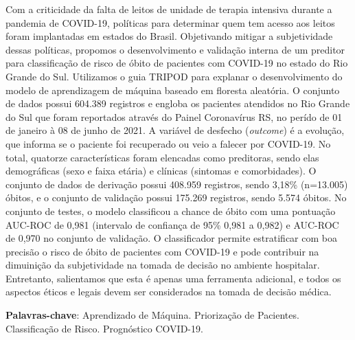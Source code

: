 \begin{resumo}

Com a criticidade da falta de leitos de unidade de terapia intensiva durante a pandemia de COVID-19, políticas para determinar quem tem acesso aos leitos foram implantadas em estados do Brasil. Objetivando mitigar a subjetividade dessas políticas, propomos o desenvolvimento e validação interna de um preditor para classificação de risco de óbito de pacientes com COVID-19 no estado do Rio Grande do Sul.
Utilizamos o guia TRIPOD para explanar o desenvolvimento do modelo de aprendizagem de máquina baseado em floresta aleatória.
O conjunto de dados possui 604.389 registros e engloba os pacientes atendidos no Rio Grande do Sul que foram reportados através do Painel Coronavírus RS, no perído de 01 de janeiro à 08 de junho de 2021.
A variável de desfecho (\textit{outcome}) é a evolução, que informa se o paciente foi recuperado ou veio a falecer por COVID-19. No total, quatorze características foram elencadas como preditoras, sendo elas demográficas (sexo e faixa etária) e clínicas (sintomas e comorbidades). 
O conjunto de dados de derivação possui 408.959 registros, sendo 3,18\% (n=13.005) óbitos, e o conjunto de validação possui 175.269 registros, sendo 5.574 óbitos. No conjunto de testes, o modelo classificou a chance de óbito com uma pontuação AUC-ROC de 0,981 (intervalo de confiança  de 95\% 0,981 a 0,982) e AUC-ROC de 0,970 no conjunto de validação.
O classificador permite estratificar com boa precisão o risco de óbito de pacientes com COVID-19 e pode contribuir na dimuinição da subjetividade na tomada de decisão no ambiente hospitalar. Entretanto, salientamos que esta é apenas uma ferramenta adicional, e todos os aspectos éticos e legais devem ser considerados na tomada de decisão médica.
\vspace{\onelineskip}

    
 \noindent
 \textbf{Palavras-chave}: Aprendizado de Máquina. Priorização de Pacientes. Classificação de Risco. Prognóstico COVID-19.
\end{resumo}
